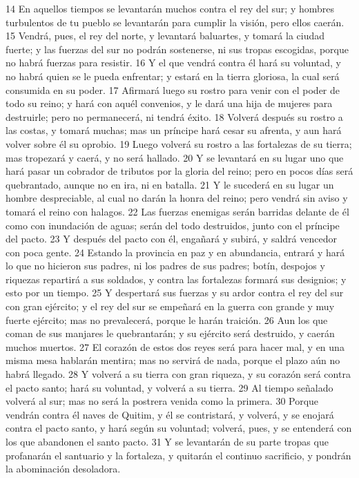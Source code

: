 14 En aquellos tiempos se levantarán muchos contra el rey del sur; y hombres turbulentos de tu pueblo se levantarán para cumplir la visión, pero ellos caerán.
15 Vendrá, pues, el rey del norte, y levantará baluartes, y tomará la ciudad fuerte; y las fuerzas del sur no podrán sostenerse, ni sus tropas escogidas, porque no habrá fuerzas para resistir.
16 Y el que vendrá contra él hará su voluntad, y no habrá quien se le pueda enfrentar; y estará en la tierra gloriosa, la cual será consumida en su poder.
17 Afirmará luego su rostro para venir con el poder de todo su reino; y hará con aquél convenios, y le dará una hija de mujeres para destruirle; pero no permanecerá, ni tendrá éxito.
18 Volverá después su rostro a las costas, y tomará muchas; mas un príncipe hará cesar su afrenta, y aun hará volver sobre él su oprobio.
19 Luego volverá su rostro a las fortalezas de su tierra; mas tropezará y caerá, y no será hallado.
20 Y se levantará en su lugar uno que hará pasar un cobrador de tributos por la gloria del reino; pero en pocos días será quebrantado, aunque no en ira, ni en batalla.
21 Y le sucederá en su lugar un hombre despreciable, al cual no darán la honra del reino; pero vendrá sin aviso y tomará el reino con halagos.
22 Las fuerzas enemigas serán barridas delante de él como con inundación de aguas; serán del todo destruidos, junto con el príncipe del pacto.
23 Y después del pacto con él, engañará y subirá, y saldrá vencedor con poca gente.
24 Estando la provincia en paz y en abundancia, entrará y hará lo que no hicieron sus padres, ni los padres de sus padres; botín, despojos y riquezas repartirá a sus soldados, y contra las fortalezas formará sus designios; y esto por un tiempo.
25 Y despertará sus fuerzas y su ardor contra el rey del sur con gran ejército; y el rey del sur se empeñará en la guerra con grande y muy fuerte ejército; mas no prevalecerá, porque le harán traición.
26 Aun los que coman de sus manjares le quebrantarán; y su ejército será destruido, y caerán muchos muertos.
27 El corazón de estos dos reyes será para hacer mal, y en una misma mesa hablarán mentira; mas no servirá de nada, porque el plazo aún no habrá llegado.
28 Y volverá a su tierra con gran riqueza, y su corazón será contra el pacto santo; hará su voluntad, y volverá a su tierra.
29 Al tiempo señalado volverá al sur; mas no será la postrera venida como la primera.
30 Porque vendrán contra él naves de Quitim, y él se contristará, y volverá, y se enojará contra el pacto santo, y hará según su voluntad; volverá, pues, y se entenderá con los que abandonen el santo pacto.
31 Y se levantarán de su parte tropas que profanarán el santuario y la fortaleza, y quitarán el continuo sacrificio, y pondrán la abominación desoladora. 
